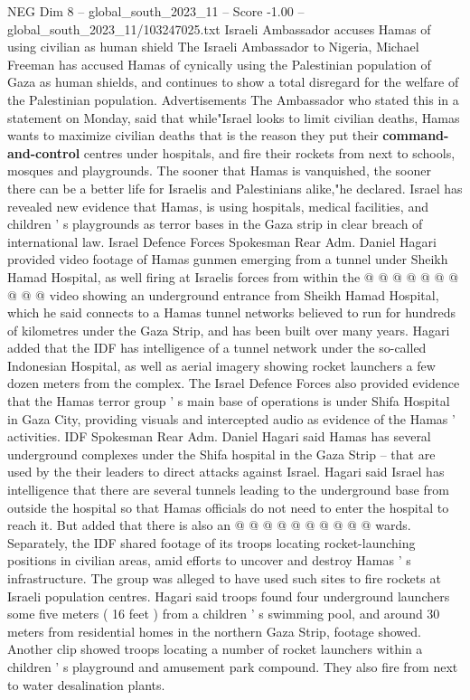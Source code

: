 \begin{textsample}{NEG Dim 8 – global\_south\_2023\_11 – Score -1.00 – global\_south\_2023\_11/103247025.txt}  \label{ex:f8_neg_086}
Israeli Ambassador accuses Hamas of using civilian as human shield The Israeli Ambassador to Nigeria, Michael Freeman has accused Hamas of cynically using the Palestinian population of Gaza as human shields, and continues to show a total disregard for the welfare of the Palestinian population.
Advertisements The Ambassador who stated this in a statement on Monday, said that while"Israel looks to limit civilian deaths, Hamas wants to maximize civilian deaths that is the reason they put their \textbf{command-and-control} centres under hospitals, and fire their rockets from next to schools, mosques and playgrounds.
The sooner that Hamas is vanquished, the sooner there can be a better life for Israelis and Palestinians alike,"he declared.
Israel has revealed new evidence that Hamas, is using hospitals, medical facilities, and children ' s playgrounds as terror bases in the Gaza strip in clear breach of international law.
Israel Defence Forces Spokesman Rear Adm.
Daniel Hagari provided video footage of Hamas gunmen emerging from a tunnel under Sheikh Hamad Hospital, as well firing at Israelis forces from within the @ @ @ @ @ @ @ @ @ @ video showing an underground entrance from Sheikh Hamad Hospital, which he said connects to a Hamas tunnel networks believed to run for hundreds of kilometres under the Gaza Strip, and has been built over many years.
Hagari added that the IDF has intelligence of a tunnel network under the so-called Indonesian Hospital, as well as aerial imagery showing rocket launchers a few dozen meters from the complex.
The Israel Defence Forces also provided evidence that the Hamas terror group ' s main base of operations is under Shifa Hospital in Gaza City, providing visuals and intercepted audio as evidence of the Hamas ' activities.
IDF Spokesman Rear Adm.
Daniel Hagari said Hamas has several underground complexes under the Shifa hospital in the Gaza Strip -- that are used by the their leaders to direct attacks against Israel.
Hagari said Israel has intelligence that there are several tunnels leading to the underground base from outside the hospital so that Hamas officials do not need to enter the hospital to reach it.
But added that there is also an @ @ @ @ @ @ @ @ @ @ wards.
Separately, the IDF shared footage of its troops locating rocket-launching positions in civilian areas, amid efforts to uncover and destroy Hamas ' s infrastructure.
The group was alleged to have used such sites to fire rockets at Israeli population centres.
Hagari said troops found four underground launchers some five meters ( 16 feet ) from a children ' s swimming pool, and around 30 meters from residential homes in the northern Gaza Strip, footage showed.
Another clip showed troops locating a number of rocket launchers within a children ' s playground and amusement park compound.
They also fire from next to water desalination plants.

\end{textsample}
